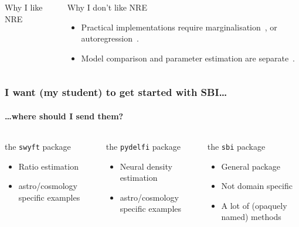 \documentclass[aspectratio=169]{beamer}
\begin{document}
\begin{frame}
\begin{columns}
{\begin{block}{Why I like NRE}
            \end{block}
            \begin{block}{Why I don't like NRE}
                \begin{itemize}
                    \item Practical implementations require marginalisation~, or autoregression~.
                    \item Model comparison and parameter estimation are separate~.
                \end{itemize}
            \end{block}
        }
    \end{columns}
\end{frame}

\begin{frame}
    \frametitle{I want (my student) to get started with SBI\ldots}
    \framesubtitle{\ldots where should I send them?}
    \begin{columns}
        \begin{block}{the \texttt{swyft} package}
            \begin{itemize}
                \item Ratio estimation
                \item astro/cosmology specific examples
            \end{itemize}
            {\small {}}
        \end{block}
        \begin{block}{the \texttt{pydelfi} package}
            \begin{itemize}
                \item Neural density estimation
                \item astro/cosmology specific examples
            \end{itemize}
            {\small {}}
        \end{block}
        \begin{block}{the \texttt{sbi} package}
            \begin{itemize}
                \item General package
                \item Not domain specific
                \item A lot of (opaquely named) methods
            \end{itemize}

\end{block}
\end{columns}
\end{frame}
\end{document}
